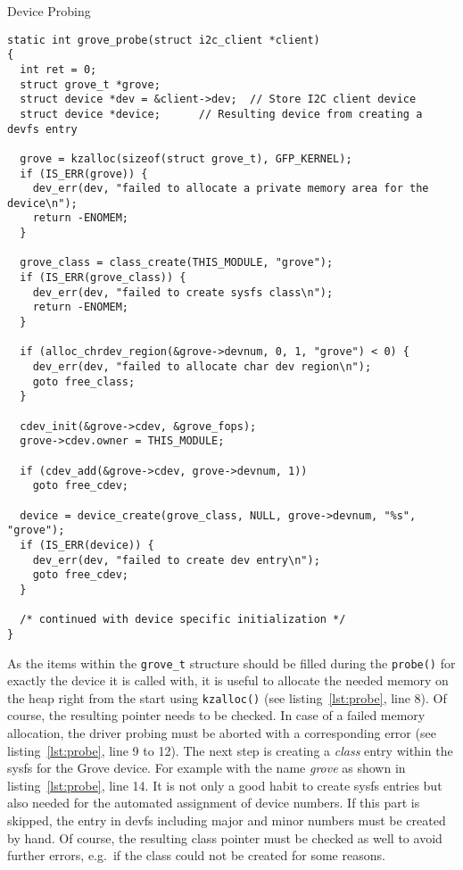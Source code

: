 \begin{listing} [H]
    \caption{Device Probing}
    \label{lst:probe}
    \begin{verbatim}
static int grove_probe(struct i2c_client *client)
{
  int ret = 0;
  struct grove_t *grove;
  struct device *dev = &client->dev;  // Store I2C client device
  struct device *device;      // Resulting device from creating a devfs entry

  grove = kzalloc(sizeof(struct grove_t), GFP_KERNEL);
  if (IS_ERR(grove)) {
    dev_err(dev, "failed to allocate a private memory area for the device\n");
    return -ENOMEM;
  }

  grove_class = class_create(THIS_MODULE, "grove");
  if (IS_ERR(grove_class)) {
    dev_err(dev, "failed to create sysfs class\n");
    return -ENOMEM;
  }

  if (alloc_chrdev_region(&grove->devnum, 0, 1, "grove") < 0) {
    dev_err(dev, "failed to allocate char dev region\n");
    goto free_class;
  }

  cdev_init(&grove->cdev, &grove_fops);
  grove->cdev.owner = THIS_MODULE;

  if (cdev_add(&grove->cdev, grove->devnum, 1))
    goto free_cdev;

  device = device_create(grove_class, NULL, grove->devnum, "%s", "grove");
  if (IS_ERR(device)) {
    dev_err(dev, "failed to create dev entry\n");
    goto free_cdev;
  }
  
  /* continued with device specific initialization */
}
    \end{verbatim}
\end{listing}
%
As the items within the \texttt{grove\_t} structure should be filled during the \texttt{probe()} for exactly the device it is called with, it is useful to allocate the needed memory on the heap right from the start using \texttt{kzalloc()} (see listing~\ref{lst:probe}, line 8).
Of course, the resulting pointer needs to be checked.
In case of a failed memory allocation, the driver probing must be aborted with a corresponding error (see listing~\ref{lst:probe}, line 9 to 12).
The next step is creating a \textit{class} entry within the sysfs for the Grove device.
For example with the name \textit{grove} as shown in listing~\ref{lst:probe}, line 14.
It is not only a good habit to create sysfs entries but also needed for the automated assignment of device numbers.
If this part is skipped, the entry in devfs including major and minor numbers must be created by hand.
Of course, the resulting class pointer must be checked as well to avoid further errors, e.g.\ if the class could not be created for some reasons.


